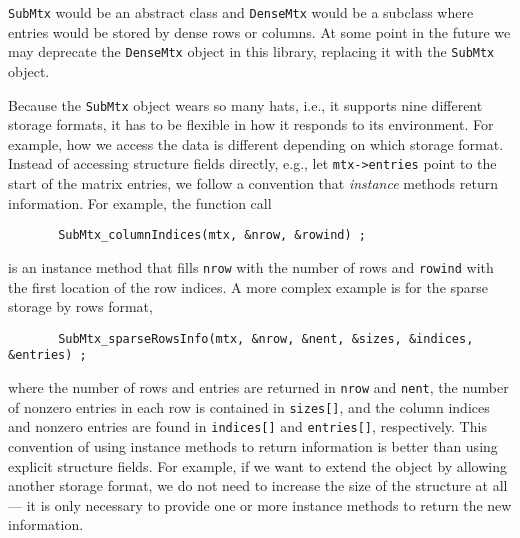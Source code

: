 {\tt SubMtx} would be an abstract class and {\tt DenseMtx} would be
a subclass where entries would be stored by dense rows or columns.
At some point in the future we may deprecate the {\tt DenseMtx}
object in this library, replacing it with the {\tt SubMtx} object.
\par
Because the {\tt SubMtx} object wears so many hats, i.e., it supports
nine different storage formats, it has to be flexible in how it
responds to its environment.
For example, how we access the data is different depending on which
storage format.
Instead of accessing structure fields directly,
e.g., let {\tt mtx->entries} point to the start of the matrix entries,
we follow a convention that {\it instance} methods return
information.
For example, the function call
\begin{verbatim}
       SubMtx_columnIndices(mtx, &nrow, &rowind) ;
\end{verbatim}
is an instance method that fills {\tt nrow} with the number of
rows and {\tt rowind} with the first location of the row indices.
A more complex example is for the sparse storage by rows format,
\begin{verbatim}
       SubMtx_sparseRowsInfo(mtx, &nrow, &nent, &sizes, &indices, &entries) ;
\end{verbatim}
where the number of rows and entries are returned in {\tt nrow}
and {\tt nent}, the number of nonzero
entries in each row is contained in {\tt sizes[]},
and the column indices and nonzero entries are found in 
{\tt indices[]} and {\tt entries[]}, respectively. 
This convention of using instance methods to return information
is better than using explicit structure fields.
For example, if we want to extend the object by allowing another
storage format, we do not need to increase the size of the structure 
at all --- it is only necessary to provide one or more instance methods
to return the new information.
